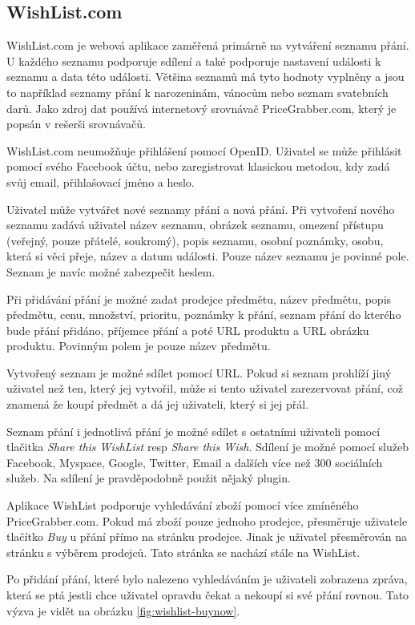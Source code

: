 \subsection{WishList.com}
WishList.com je webová aplikace zaměřená primárně na vytváření seznamu přání. U každého seznamu podporuje sdílení a také podporuje nastavení události k seznamu a data této události. Většina seznamů má tyto hodnoty vyplněny a jsou to například seznamy přání k narozeninám, vánocům nebo seznam svatebních darů. Jako zdroj dat používá internetový srovnávač PriceGrabber.com, který je popsán v rešerši srovnávačů.

WishList.com neumožňuje přihlášení pomocí OpenID. Uživatel se může přihlásit pomocí svého Facebook účtu, nebo zaregistrovat klasickou metodou, kdy zadá svůj email, přihlašovací jméno a heslo.

Uživatel může vytvářet nové seznamy přání a nová přání. Při vytvoření nového seznamu zadává uživatel název seznamu, obrázek seznamu, omezení přístupu (veřejný, pouze přátelé, soukromý), popis seznamu, osobní poznámky, osobu, která si věci přeje, název a datum události. Pouze název seznamu je povinné pole. Seznam je navíc možné zabezpečit heslem.

Při přidávání přání je možné zadat prodejce předmětu, název předmětu, popis předmětu, cenu, množství, prioritu, poznámky k přání, seznam přání do kterého bude přání přidáno, příjemce přání a poté URL produktu a URL obrázku produktu. Povinným polem je pouze název předmětu.

Vytvořený seznam je možné sdílet pomocí URL. Pokud si seznam prohlíží jiný uživatel než ten, který jej vytvořil, může si tento uživatel zarezervovat přání, což znamená že koupí předmět a dá jej uživateli, který si jej přál.

Seznam přání i jednotlivá přání je možné sdílet s ostatními uživateli pomocí tlačitka \emph{Share this WishList} resp \emph{Share this Wish}. Sdílení je možné pomocí služeb Facebook, Myspace, Google, Twitter, Email a dalších více než 300 sociálních služeb. Na sdílení je pravděpodobně použit nějaký plugin.

Aplikace WishList podporuje vyhledávání zboží pomocí více zmíněného PriceGrabber.com. Pokud má zboží pouze jednoho prodejce, přesměruje uživatele tlačítko \emph{Buy} u přání přímo na stránku prodejce. Jinak je uživatel přesměrován na stránku s výběrem prodejců. Tato stránka se nachází stále na WishList.

Po přidání přání, které bylo nalezeno vyhledáváním je uživateli zobrazena zpráva, která se ptá jestli chce uživatel opravdu čekat a nekoupí si své přání rovnou. Tato výzva je vidět na obrázku \ref{fig:wishlist-buynow}.

